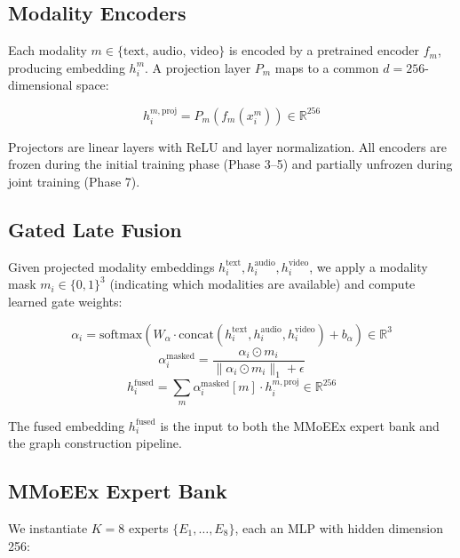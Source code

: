 \documentclass[12pt,oneside]{book}
\begin{document}
\subsection{Modality Encoders}

Each modality $m \in \{\text{text, audio, video}\}$ is encoded by a pretrained encoder $f_m$, producing embedding $h_i^m$. A projection layer $P_m$ maps to a common $d=256$-dimensional space:

\begin{equation}
    h_i^{m,\text{proj}} = P_m(f_m(x_i^m)) \in \mathbb{R}^{256}
\end{equation}

Projectors are linear layers with ReLU and layer normalization. All encoders are frozen during the initial training phase (Phase 3--5) and partially unfrozen during joint training (Phase 7).

\subsection{Gated Late Fusion}

Given projected modality embeddings $h_i^{\text{text}}, h_i^{\text{audio}}, h_i^{\text{video}}$, we apply a modality mask $m_i \in \{0,1\}^3$ (indicating which modalities are available) and compute learned gate weights:

\begin{equation}
    \alpha_i = \text{softmax}(W_\alpha \cdot \text{concat}(h_i^{\text{text}}, h_i^{\text{audio}}, h_i^{\text{video}}) + b_\alpha) \in \mathbb{R}^3
\end{equation}
\begin{equation}
    \alpha_i^{\text{masked}} = \frac{\alpha_i \odot m_i}{\|\alpha_i \odot m_i\|_1 + \epsilon}
\end{equation}
\begin{equation}
    h_i^{\text{fused}} = \sum_{m} \alpha_i^{\text{masked}}[m] \cdot h_i^{m,\text{proj}} \in \mathbb{R}^{256}
\end{equation}

The fused embedding $h_i^{\text{fused}}$ is the input to both the MMoEEx expert bank and the graph construction pipeline.

\subsection{MMoEEx Expert Bank}

We instantiate $K=8$ experts $\{E_1, \ldots, E_8\}$, each an MLP with hidden dimension 256:
\end{document}
